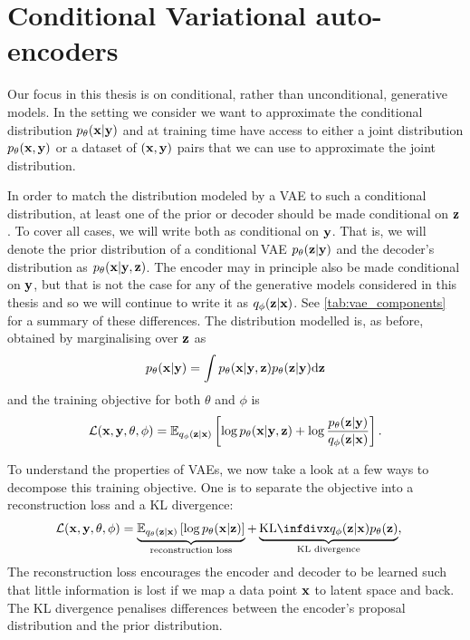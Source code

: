 \section{Conditional Variational auto-encoders}
Our focus in this thesis is on conditional, rather than unconditional, generative models. In the setting we consider we want to approximate the conditional distribution $p_\theta({\mathbf{x}}|{\mathbf{y}})$ and at training time have access to either a joint distribution $p_\theta({\mathbf{x}},{\mathbf{y}})$ or a dataset of $({\mathbf{x}}, {\mathbf{y}})$ pairs that we can use to approximate the joint distribution.

In order to match the distribution modeled by a VAE to such a conditional distribution, at least one of the prior or decoder should be made conditional on ${\mathbf{z}}$. To cover all cases, we will write both as conditional on ${\mathbf{y}}$. That is, we will denote the prior distribution of a conditional VAE $p_\theta({\mathbf{z}}|{\mathbf{y}})$ and the decoder's distribution as $p_\theta({\mathbf{x}}|{\mathbf{y}},{\mathbf{z}})$. The encoder may in principle also be made conditional on ${\mathbf{y}}$, but that is not the case for any of the generative models considered in this thesis and so we will continue to write it as $q_\phi({\mathbf{z}}|{\mathbf{x}})$. See \cref{tab:vae_components} for a summary of these differences. The distribution modelled is, as before, obtained by marginalising over ${\mathbf{z}}$ as
\begin{equation} \label{eq:vae-marginal}
p_\theta({\mathbf{x}}|{\mathbf{y}}) = \int p_\theta({\mathbf{x}}|{\mathbf{y}},{\mathbf{z}})p_\theta({\mathbf{z}}|{\mathbf{y}}) \mathrm{d}{\mathbf{z}}
\end{equation}
and the training objective for both $\theta$ and $\phi$ is
\begin{equation}
    {\mathcal{L}}({\mathbf{x}}, {\mathbf{y}}, \theta, \phi) = \mathbb{E}_{q_\phi({\mathbf{z}}|{\mathbf{x}})} \left[ \log p_\theta({\mathbf{x}}|{\mathbf{y}},{\mathbf{z}}) + \log \frac{p_\theta({\mathbf{z}}|{\mathbf{y}})}{q_\phi({\mathbf{z}}|{\mathbf{x}})} \right].
\end{equation}

To understand the properties of VAEs, we now take a look at a few ways to decompose this training objective. One is to separate the objective into a reconstruction loss and a KL divergence:
\begin{align}
    \gL(\rvx, \rvy, \theta, \phi) &= \underbrace{\EX_{q_\theta(\rvz|\rvx)} \left[ \log p_\theta(\rvx|\rvz) \right]}_\text{reconstruction loss} + \underbrace{\kl{q_\phi(\rvz|\rvx)}{p_\theta(\rvz)}}_\text{KL divergence},
\label{eq:marginal-is}
\end{align}
The reconstruction loss encourages the encoder and decoder to be learned such that little information is lost if we map a data point ${\mathbf{x}}$ to latent space and back. The KL divergence penalises differences between the encoder's proposal distribution and the prior distribution.

